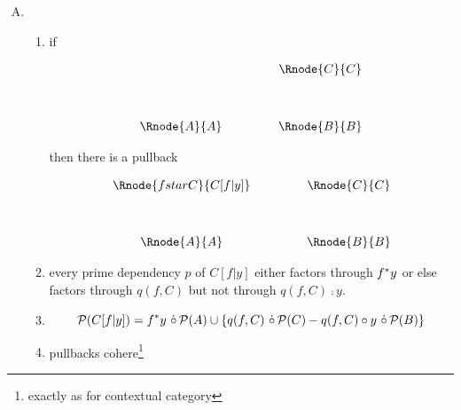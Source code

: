\documentclass[10pt,a4paper]{scrartcl}
\begin{document}
\begin{enumerate} [A.,leftmargin=0.5cm]
\item  
\begin{enumerate}[label*=\arabic*]
\item 
{}
	if
\begin{center}
\begin{displaymath}
\begin{array}{cp{.9cm}c}
            & & \Rnode{C}{C} \\ [1.2cm]
\Rnode{A}{A}& & \Rnode{B}{B} \\
\end{array}
\end{displaymath}
\end{center}

then there is a pullback 
\vspace{3mm}
\begin{center}
\begin{displaymath}
\begin{array}{cp{.9cm}c}
\Rnode{fstarC}{C[f|y]} & & \Rnode{C}{C}\\ [1.2cm]
\Rnode{A}{A}         & & \Rnode{B}{B}
\end{array}
\end{displaymath}
\end{center}
\item 
{}
every prime dependency $p$ of $C[f|y]$ either factors through $f ^* y$ or else factors 
through $q(f,C)$ but not through $q(f,C) \comp y$. 
\item 
{}

$$\mathcal{P}(C[f|y])= f ^* y \ \dot{\circ}\, \mathcal{P}(A) \cup \{ q(f,C) \ \dot{\circ}\, \mathcal{P}(C) - q(f,C) \circ y \ \dot{\circ}\, \mathcal{P}(B)\}$$
\item 
{}

pullbacks cohere\footnote{exactly as for contextual category}


\end{enumerate}
\end{enumerate}
\end{document}
